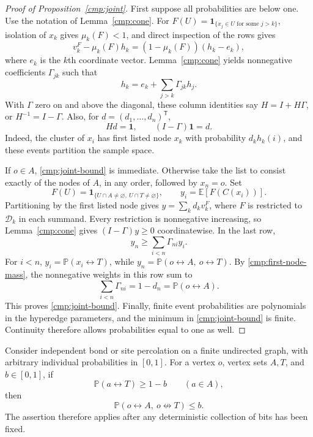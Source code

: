 \begin{proof}[Proof of Proposition~\ref{cmp:joint}]
First suppose all probabilities are below one. Use the notation of
Lemma~\ref{cmp:cone}. For
$F(U)=\mathbf 1_{\{x_j\in U\text{ for some }j>k\}}$, isolation of $x_k$
gives $\mu_k(F)<1$, and direct inspection of the rows gives
\[
 v_k^F-\mu_k(F)h_k=(1-\mu_k(F))(h_k-e_k),
\]
where $e_k$ is the $k$th coordinate vector. Lemma~\ref{cmp:cone} yields
nonnegative coefficients $\Gamma_{jk}$ such that
\[
 h_k=e_k+\sum_{j>k}\Gamma_{jk}h_j.
\]
With $\Gamma$ zero on and above the diagonal, these column identities say
$H=I+H\Gamma$, or $H^{-1}=I-\Gamma$. Also, for $d=(d_1,\ldots,d_n)^\mathsf T$,
\begin{equation}\label{cmp:first-node-mass}
 Hd=\mathbf 1,\qquad (I-\Gamma)\mathbf 1=d.
\end{equation}
Indeed, the cluster of $x_i$ has first listed node $x_k$ with probability
$d_kh_k(i)$, and these events partition the sample space.

If $o\in A$, \eqref{cmp:joint-bound} is immediate. Otherwise take the list
to consist exactly of the nodes of $A$, in any order, followed by $x_n=o$.
Set
\[
 F(U)=\mathbf 1_{\{U\cap A\ne\varnothing,\ U\cap T\ne\varnothing\}},
 \qquad y_i=\mathbb E[F(C(x_i))].
\]
Partitioning by the first listed node gives
$y=\sum_k d_kv_k^F$, where $F$ is restricted to $\mathcal D_k$ in each
summand. Every restriction is nonnegative increasing, so
Lemma~\ref{cmp:cone} gives $(I-\Gamma)y\ge0$ coordinatewise. In the last row,
\[
 y_n\ge\sum_{i<n}\Gamma_{ni}y_i.
\]
For $i<n$, $y_i=\mathbb P(x_i\leftrightarrow T)$, while
$y_n=\mathbb P(o\leftrightarrow A,\ o\leftrightarrow T)$. By
\eqref{cmp:first-node-mass}, the nonnegative weights in this row sum to
\[
 \sum_{i<n}\Gamma_{ni}=1-d_n=\mathbb P(o\leftrightarrow A).
\]
This proves \eqref{cmp:joint-bound}. Finally, finite event probabilities are
polynomials in the hyperedge parameters, and the minimum in
\eqref{cmp:joint-bound} is finite. Continuity therefore allows probabilities
equal to one as well.
\end{proof}

\begin{corollary}\label{cmp:failure}
Consider independent bond or site percolation on a finite undirected graph,
with arbitrary individual probabilities in $[0,1]$. For a vertex $o$, vertex
sets $A,T$, and $b\in[0,1]$, if
\[
 \mathbb P(a\leftrightarrow T)\ge1-b\qquad(a\in A),
\]
then
\begin{equation}\label{cmp:failure-bound}
 \mathbb P(o\leftrightarrow A,\ o\not\leftrightarrow T)\le b.
\end{equation}
The assertion therefore applies after any deterministic collection of bits
has been fixed.
\end{corollary}

